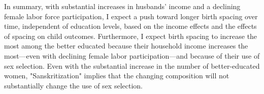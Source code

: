 
In summary, with substantial increases in husbands' income and a declining female labor 
force participation, I expect a push toward longer birth spacing over time, independent
of education levels, based on the income effects and the effects of spacing
on child outcomes.
Furthermore, I expect birth spacing to increase the most among the better educated 
because their household income increases the most---even with declining female labor 
participation---and because of their use of sex selection.
Even with the substantial increase in the number of better-educated women, 
"Sanskritization" implies that the changing composition will not substantially change 
the use of sex selection.






